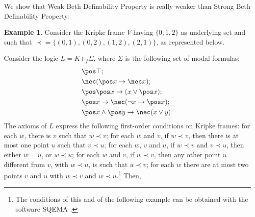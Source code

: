 \documentclass{article}
\theoremstyle{definition}
\newtheorem{example}{Example}
\begin{document}
We show that Weak Beth Definability Property is really weaker than Strong Beth Definability Property:

\begin{example}\label{ex:wbeth}
Consider the Kripke frame $V$ having $\{0,1,2\}$ as underlying set and such that $\prec = \{(0,1),(0,2),(1,2),(2,1)\}$, as represented below.
\begin{center}
\end{center}
Consider the logic $L = K +_f \Sigma$, where $\Sigma$ is the following set of modal formulas:
\begin{align*}
    &\pos \top; \\
    &\nec (\pos x \rightarrow \nec x); \\
    &\pos \pos x \to (x \vee \pos x); \\
    &\pos x \to \nec (\neg x \to \pos x); \\
    &\pos x \wedge \pos y \to \nec (x \vee y).
\end{align*}
The axioms of $L$ express the following first-order conditions on Kripke frames: for each $w$, there is $v$ such that $w \prec v$; for each $w$ and $v$, if $w \prec v$, then there is at most one point $u$ such that $v \prec u$; for each $w$, $v$ and $u$, if $w \prec v$ and $v \prec u$, then either $w = u$, or $w \prec u$; for each $w$ and $v$, if $w \prec v$, then any other point $u$ different from $v$, with $w \prec u$, is such that $u \prec v$; for each $w$ there are at most two points $v$ and $u$ with $w \prec v$ and $w \prec u$.\footnote{The conditions of this and of the following example can be obtained with the software SQEMA \cite{MR2295764}.} Then,

\end{example}
\end{document}
